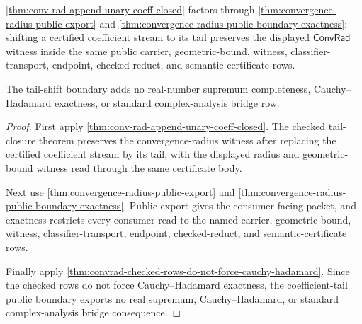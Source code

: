\begin{theorem}
\label{thm:convergence-radius-tail-shift-public-boundary}
\autoref{thm:conv-rad-append-unary-coeff-closed} factors through
\autoref{thm:convergence-radius-public-export} and
\autoref{thm:convergence-radius-public-boundary-exactness}: shifting a
certified coefficient stream to its tail preserves the displayed
$\mathsf{ConvRad}$ witness inside the same public carrier,
geometric-bound, witness, classifier-transport, endpoint, checked-reduct, and
semantic-certificate rows.

The tail-shift boundary adds no real-number supremum completeness,
Cauchy--Hadamard exactness, or standard complex-analysis bridge row.
\end{theorem}
\begin{proof}
First apply \autoref{thm:conv-rad-append-unary-coeff-closed}. The checked
tail-closure theorem preserves the convergence-radius witness after replacing
the certified coefficient stream by its tail, with the displayed radius and
geometric-bound witness read through the same certificate body.

Next use \autoref{thm:convergence-radius-public-export} and
\autoref{thm:convergence-radius-public-boundary-exactness}. Public export gives
the consumer-facing packet, and exactness restricts every consumer read to the
named carrier, geometric-bound, witness, classifier-transport, endpoint,
checked-reduct, and semantic-certificate rows.

Finally apply
\autoref{thm:convrad-checked-rows-do-not-force-cauchy-hadamard}. Since the
checked rows do not force Cauchy--Hadamard exactness, the coefficient-tail
public boundary exports no real supremum, Cauchy--Hadamard, or standard
complex-analysis bridge consequence.
\end{proof}

